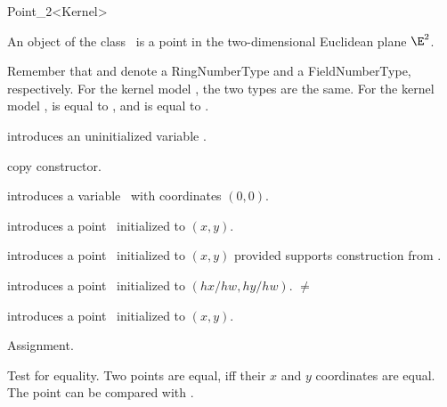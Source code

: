\begin{ccRefClass} {Point_2<Kernel>}

\ccDefinition
An object of the class \ccRefName\ is a point in the two-dimensional
Euclidean plane $\E^2$. 

Remember that  and  denote a
RingNumberType and a FieldNumberType, respectively. For the kernel
model , the two types are the same. For the
kernel model ,  is equal
to , and  is equal to
.

\ccTypes
{}
\ccThreeToTwo


\ccCreation
{}


\ccHidden {}
             {introduces an uninitialized variable \ccVar.}

\ccHidden {}
            {copy constructor.}

            {introduces a variable \ccVar\ with  coordinates
              $(0,0)$.}

            {introduces a point \ccVar\ initialized to $(x,y)$.}

            {introduces a point \ccVar\ initialized to $(x,y)$
             provided  supports construction from .}

            {introduces a point \ccVar\ initialized to $(hx/hw,hy/hw)$.
             \ccPrecond {} $\neq$  }

            {introduces a point \ccVar\ initialized to $(x,y)$.}


\ccOperations

\ccHidden {}
        {Assignment.}

       {Test for equality. Two points are equal, iff their $x$ and $y$ 
        coordinates are equal. The point can be compared with
                .}


\end{ccRefClass}
